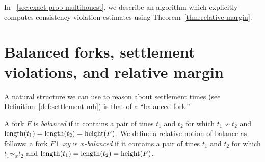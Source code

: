 In \Section~\ref{sec:exact-prob-multihonest}, 
we describe an algorithm which explicitly computes 
consistency violation estimates using Theorem~\ref{thm:relative-margin}.


\section{Balanced forks, settlement violations, and relative margin}

A natural structure we can use to reason about settlement times 
(see Definition~\ref{def:settlement-mh}) 
is that of a ``balanced fork.''

\begin{definition}\label{def:balanced-fork} A
  fork $F$ is \emph{balanced} if it contains a pair of tines $t_1$ and
  $t_2$ for which $t_1\nsim t_2$ and
  $\operatorname{length}(t_1)=\operatorname{length}(t_2)=\operatorname{height}(F)$. We define a relative notion
  of balance as follows: a fork $F \vdash xy$ is \emph{$x$-balanced}
  if it contains a pair of tines $t_1$ and $t_2$ for which
  $t_1 \not\sim_x t_2$ and $\operatorname{length}(t_1) = \operatorname{length}(t_2) = \operatorname{height}(F)$.
\end{definition}

